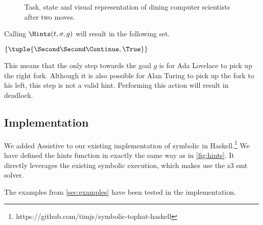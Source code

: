 \begin{figure}
\begin{minipage}[r]{0.3\textwidth}
\end{minipage}
\caption{Task, state and visual representation of dining computer scientists after two moves.}
\end{figure}




Calling $\Hints(t,\sigma,g)$ will result in the following set.

$\{ \tuple{\Second\Second\Continue,\True}\}$

This means that the only step towards the goal $g$ is for Ada Lovelace to pick up the right fork.
Although it is also possible for Alan Turing to pick up the fork to his left, this step is not a valid hint.
Performing this action will result in deadlock.


\subsection{Implementation}
\label{sec:implementation}

We added Assistive \TOPHAT to our existing implementation of symbolic \TOPHAT in Haskell.\footnote{https://github.com/timjs/symbolic-tophat-haskell}
We have defined the hints function in exactly the same way as in \cref{fig:hints}.
It directly leverages the existing symbolic execution, which makes use the z3 smt solver.

The examples from \cref{sec:examples} have been tested in the implementation.
